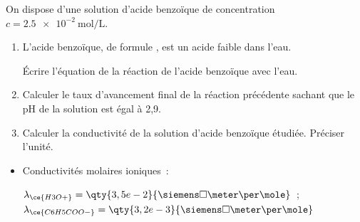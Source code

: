 On dispose d'une solution d'acide benzoïque de concentration
$c=\qty{2.5e-2}{\mol\per\L}$.

\begin{enumerate}
  \item L'acide benzoïque, de formule , est un acide faible dans
        l'eau.

        Écrire l'équation de la réaction de l'acide benzoïque avec l'eau.
  \item Calculer le taux d'avancement final de la réaction précédente sachant
        que le pH de la solution est égal à 2,9.
  \item Calculer la conductivité de la solution d'acide benzoïque étudiée.
        Préciser l'unité.
\end{enumerate}
\begin{donnees}
\begin{itemize}
    \item Conductivités molaires ioniques~: \par
    $\lambda_{\ce{H3O+}}=\qty{3,5e-2}{\siemens\square\meter\per\mole}$~;
    $\lambda_{\ce{C6H5COO-}}=\qty{3,2e-3}{\siemens\square\meter\per\mole}$
\end{itemize}
\end{donnees}


